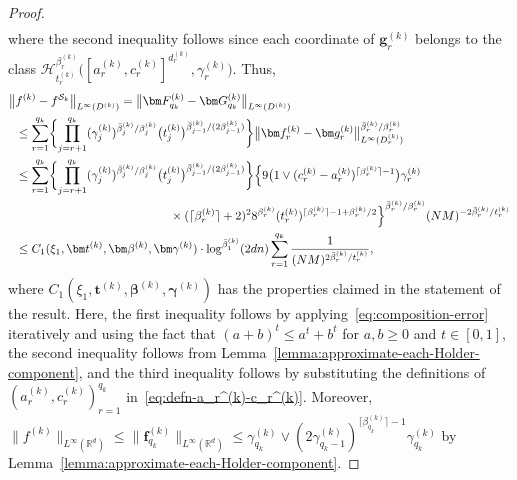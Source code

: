\documentclass[12pt]{article}
\begin{document}
\begin{proof}
\begin{align}
    \end{align}
    where the second inequality follows since each coordinate of $\bm g_r^{(k)}$ belongs to the class  $\mathcal{H}_{t_r^{(k)}}^{\beta_r^{(k)}}\bigl([a_r^{(k)},c_r^{(k)}]^{d_r^{(k)}}, \gamma_r^{(k)}\bigr)$.
    Thus, 
    \begin{align*}
        \bigl\|&f^{(k)} - f^{\mathcal{S}_k}\bigr\|_{L^{\infty}(D^{(k)})} = \bigl\|\bm F^{(k)}_{q_k} - \bm G^{(k)}_{q_k}\bigr\|_{L^{\infty}(D^{(k)})}\\
        &\leq \sum_{r=1}^{q_k} \biggl\{ \prod_{j=r+1}^{q_k} (\gamma^{(k)}_j)^{\bar{\beta}_j^{(k)} / \beta_j^{(k)}}\bigl(t^{(k)}_j\bigr)^{\bar{\beta}_{j-1}^{(k)} / (2\beta_{j-1}^{(k)})} \biggr\} \bigl\|\bm f^{(k)}_r - \bm g^{(k)}_r\bigr\|_{L^{\infty} (D^{(k)}_r)}^{\bar{\beta}^{(k)}_r / \beta^{(k)}_r}\\
        &\leq \sum_{r=1}^{q_k} \biggl\{ \prod_{j=r+1}^{q_k} (\gamma^{(k)}_j)^{\bar{\beta}_j^{(k)} / \beta_j^{(k)}}\bigl(t^{(k)}_j\bigr)^{\bar{\beta}_{j-1}^{(k)} / (2\beta_{j-1}^{(k)})} \biggr\} \Bigl\{9 \bigl( 1 \vee (c_r^{(k)} - a_r^{(k)})^{\lceil \beta_r^{(k)} \rceil - 1} \bigr) \gamma^{(k)}_r \\
        &\hspace{4.5cm} \times (\lceil \beta^{(k)}_r \rceil +2)^2 8^{\beta_r^{(k)}} (t^{(k)}_r)^{\lceil \beta_r^{(k)} \rceil - 1 + \beta^{(k)}_r/2} \Bigr\}^{\bar{\beta}^{(k)}_r / \beta^{(k)}_r} (NM)^{-2\bar{\beta}^{(k)}_r / t^{(k)}_r}\\
        &\leq C_1(\xi_1, \bm t^{(k)}, \bm \beta^{(k)}, \bm \gamma^{(k)}) \cdot \log^{\bar{\beta}_1^{(k)}} (2dn) \sum_{r=1}^{q_k} \frac{1}{(NM)^{2\bar{\beta}^{(k)}_r / t^{(k)}_r}},
    \end{align*}
    where $C_1(\xi_1, \bm t^{(k)}, \bm \beta^{(k)}, \bm \gamma^{(k)})$ has the properties claimed in the statement of the result.  Here, the first inequality follows by applying~\eqref{eq:composition-error} iteratively and using the fact that $(a+b)^t \leq a^t + b^t$ for $a,b \geq 0$ and $t\in[0,1]$, the second inequality follows from Lemma~\ref{lemma:approximate-each-Holder-component}, and the third inequality follows by substituting the definitions of $(a^{(k)}_r, c^{(k)}_r)_{r=1}^{q_k}$ in~\eqref{eq:defn-a_r^(k)-c_r^(k)}. Moreover, $\|f^{(k)}\|_{L^{\infty}(\mathbb{R}^d)} \leq \|\bm f^{(k)}_{q_k}\|_{L^{\infty}(\mathbb{R}^d)} \leq \gamma_{q_k}^{(k)} \vee (2\gamma_{q_k-1}^{(k)})^{\lceil\beta_{q_k}^{(k)}\rceil-1} \gamma_{q_k}^{(k)}$ by Lemma~\ref{lemma:approximate-each-Holder-component}.
\end{proof}
\end{document}

